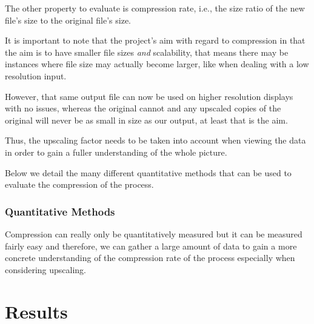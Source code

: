 \documentclass[12pt]{article}
\newcommand{\sentence}{} %
\newcommand{\italic}[1]{\textit{#1}}
\begin{document}
    \tab
    The other property to evaluate is compression rate, i.e., the size ratio of the new file's size to the original
    file's size.
    \sentence
    It is important to note that the project's aim with regard to compression in that the aim is to have smaller file
    sizes \italic{and} scalability, that means there may be instances where file size may actually become larger,
    like when dealing with a low resolution input.
    \sentence
    However, that same output file can now be used on higher resolution displays with no issues, whereas the original
    cannot and any upscaled copies of the original will never be as small in size as our output, at least that is the
    aim.
    \sentence
    Thus, the upscaling factor needs to be taken into account when viewing the data in order to gain a fuller
    understanding of the whole picture.
    \sentence
    Below we detail the many different quantitative methods that can be used to evaluate the compression of the process.

    \subsubsection{Quantitative Methods}\label{subsubsec:quantitative-methods2}

    \tab
    Compression can really only be quantitatively measured but it can be measured fairly easy and therefore, we can
    gather a large amount of data to gain a more concrete understanding of the compression rate of the
    process especially when considering upscaling.
    \sentence

    \pagebreak


    \section{Results}\label{sec:results}
\end{document}
